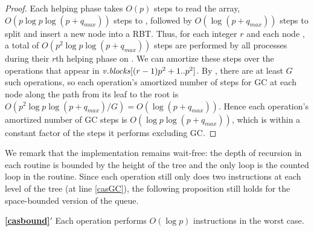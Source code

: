 \begin{proof}
Each helping phase takes $O(p)$ steps to read the  array,
$O(p \log p \log(p+q_{max}))$ steps to ,
followed by $O(\log(p+q_{max}))$ steps to split and insert a new node into a RBT.
Thus, for each integer $r$ and each node , a total of $O(p^2\log p\log(p+q_{max}))$ steps
are performed by all processes during their $r$th helping phase on .
We can amortize these steps over the operations that appear in 
$\mbox{\textnormal{\textit{v}}}.\mbox{\textit{blocks}}[(r-1)p^2+1..p^2]$.
By , there are at least $G$ such operations, 
so each operation's amortized number of steps for GC at each node along the path from its leaf to the root
is $O(p^2\log p\log(p+q_{max})/G)=O(\log(p+q_{max}))$.
Hence each operation's amortized number of GC steps is $O(\log p\log(p+q_{max}))$, which is
within a constant factor of the steps it performs excluding GC.
\end{proof}

We remark that the implementation remains wait-free:  the depth of recursion in each routine is  bounded
by the height of the tree and the only loop is the counted loop in the  routine.
Since each operation still only does two  instructions at each level of the tree (at line \ref{casGC}), the following proposition still holds for the space-bounded version of the queue.

\begin{customprop}{\bf{\ref{casbound}}$'$}
Each operation performs $O(\log p)$  instructions in the worst case.
\end{customprop}
